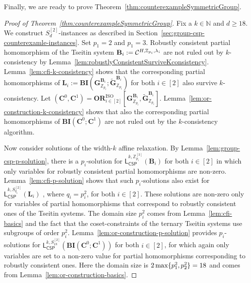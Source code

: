\documentclass[a4paper,english, thm-restate]{lipics-v2021}
\newcommand{\nat}{\mathbb{N}}
\newcommand{\ZZ}{\mathbb{Z}}
\DeclarePairedDelimiter\set{\lbrace}{\rbrace}
\newcommand{\CFIsym}{\mathbf{G}}
\newcommand{\CFIA}[2]{\CFIsym_{#1}^{#2}}
\newcommand{\CFIB}[2]{\widetilde{\CFIsym}_{#1}^{#2}}
\newcommand{\StructB}{\mathbf{B}}
\newcommand{\StructC}{\mathbf{C}}
\newcommand{\StructL}{\mathbf{L}}
\newcommand{\leqs}{\mathsf{L}}
\newcommand{\cspiso}[3]{\leqs^{#1,#2}_{\mathsf{CSP}}(#3)}
\newcommand{\bbZ}{\mathbb{Z}}
\newcommand{\bcisosys}[2]{\mathbf{BI}(#1;#2)}
\newcommand{\CosetGrpTmplt}[2]{#1^{[#2]}}
\newcommand{\Sym}[1]{S_{#1}}
\newcommand{\SymStruct}[2]{\CosetGrpTmplt{\Sym{#1}}{#2}}
\newcommand{\ORISO}[2]{\mathbf{OR}^{\text{ISO}}_{#1}[#2]}
\begin{document}
	Finally, we are ready to prove Theorem~\ref{thm:counterexampleSymmetricGroup}.
	\begin{proof}[Proof of Theorem~\ref{thm:counterexampleSymmetricGroup}]
		Fix a $k \in \nat$ and $d\geq 18$.
		We construct $\SymStruct{d}{2}$-instances as described in
		Section~\ref{sec:group-csp-counterexamle-instances}.
		Set $p_1 = 2$ and $p_1=3$.
		Robustly consistent partial homomorphism
		of the Tseitin system $\StructB_i:= \grpCSP{H}{\ZZ_{p_i}}{\lambda_i}$
		are not ruled out by $k$-consistency by Lemma~\ref{lem:robustlyConsistentSurviveKconsistency}.
		Lemma~\ref{lem:cfi-k-consistency}
		shows that the corresponding partial homomorphisms of
		$\StructL_i := \bcisosys{\CFIA{\ZZ_{p_i}}{\StructB_i}}{\CFIB{\ZZ_{p_i}}{\StructB_i}}$
		for both $i\in [2]$
		also survive $k$-consistency.
		Let  $(\StructC^0, \StructC^1) =
		\ORISO{i \in [2]}{\CFIA{\bbZ_{p_i}}{\StructB_i},\CFIB{\bbZ_{p_i}}{\StructB_i}}$.
		Lemma~\ref{lem:or-construction-k-consistency}
		shows that also the corresponding partial homomorphisms of $\bcisosys{\StructC^0}{\StructC^1}$
		are not ruled out by the $k$-consistency algorithm.
		
		Now consider solutions of the width-$k$ affine relaxation.
		By Lemma~\ref{lem:group-csp-p-solution},
		there is a $p_i$-solution for $\cspiso{k}{\CosetGrpTmplt{\ZZ_{p_i}}{3}}{\StructB_i}$
		for both $i \in[2]$
		in which only variables for robustly consistent partial homomorphisms
		are non-zero.
		Lemma~\ref{lem:cfi-p-solution} shows that such $p_i$-solutions
		also exist for $\cspiso{k}{\SymStruct{q_i}{2}}{\StructL_i}$ , where $q_i = p_i^2$,
		for both $i\in [2]$.
		These solutions are non-zero only for variables
		of partial homomorphisms that correspond to robustly consistent ones of the Tseitin systems.
		The domain size $p_i^2$ comes from Lemma~\ref{lem:cfi-basics}
		and the fact that the coset-constraints of the ternary Tseitin systems use subgroups of order $p_i^2$.
		Lemma~\ref{lem:or-construction-p-solution}
		provides $p_i$-solutions for 
		$\cspiso{k}{\SymStruct{18}{2}}{\bcisosys{\StructC^0}{\StructC^1}}$ for both $i\in[2]$,
		for which again only variables are set to a non-zero
		value for partial homomorphisms corresponding to robustly consistent ones.
		Here the domain size is $2\max\set{p_1^2,p_2^2}=18$
		and comes from Lemma~\ref{lem:or-construction-basics}.
		

\end{proof}
\end{document}
